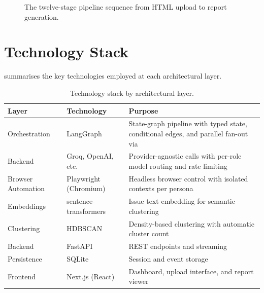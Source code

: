 \begin{figure}[htbp]
  \centering
  \caption{The twelve-stage pipeline sequence from HTML upload to report generation.}
  \label{fig:pipeline-sequence}
\end{figure}


\section{Technology Stack}
\label{sec:tech-stack}

 summarises the key technologies employed at each architectural layer.

\begin{table}[htbp]
  \centering
  \caption{Technology stack by architectural layer.}
  \label{tab:tech-stack}
  \begin{tabularx}{\textwidth}{@{}l L{3cm} X@{}}
    \toprule
    \textbf{Layer} & \textbf{Technology} & \textbf{Purpose} \\
    \midrule
    Orchestration      & LangGraph            & State-graph pipeline with typed state, conditional edges, and parallel fan-out via  \\
     Backend  & Groq, OpenAI, etc.   & Provider-agnostic  calls with per-role model routing and rate limiting \\
    Browser Automation & Playwright (Chromium) & Headless browser control with isolated contexts per persona \\
    Embeddings         & sentence-transformers & Issue text embedding for semantic clustering \\
    Clustering         & HDBSCAN              & Density-based clustering with automatic cluster count \\
    Backend   & FastAPI              & REST endpoints and  streaming \\
    Persistence        & SQLite               & Session and event storage \\
    Frontend           & Next.js (React)      & Dashboard, upload interface, and report viewer \\
    \bottomrule
  \end{tabularx}
\end{table}


